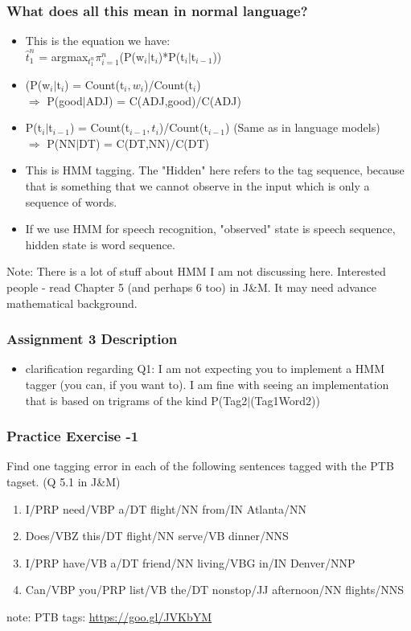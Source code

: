 \documentclass{beamer}
\begin{document}
\begin{frame}
\frametitle{What does all this mean in normal language?}
\begin{itemize}
\item This is the equation we have: \\ $\hat t_1^n$ = argmax$_{t_1^n} \pi_{i=1}^n$(P(w$_i|$t$_i$)*P(t$_i|$t$_{i-1}$))
\item (P(w$_i|$t$_i$) = Count(t$_i,w_i$)/Count(t$_i$)
\\ $\Rightarrow$ P(good$|$ADJ) = C(ADJ,good)/C(ADJ)
\item P(t$_i|$t$_{i-1}$) = Count(t$_{i-1},t_i$)/Count(t$_{i-1}$) (Same as in language models)
\\  $\Rightarrow$  P(NN$|$DT) = C(DT,NN)/C(DT)
\item This is HMM tagging. The "Hidden" here refers to the tag sequence, because that is something that we cannot observe in the input which is only a sequence of words.
\item If we use HMM for speech recognition, "observed" state is speech sequence, hidden state is word sequence.
\end{itemize}
Note: There is a lot of stuff about HMM I am not discussing here. Interested people - read Chapter 5 (and perhaps 6 too) in J\&M. It may need advance mathematical background.
\end{frame}

\begin{frame}
\frametitle{Assignment 3 Description}
\begin{itemize}
\item clarification regarding Q1: I am not expecting you to implement a HMM tagger (you can, if you want to). I am fine with seeing an implementation that is based on trigrams of the kind P(Tag2$|$(Tag1Word2))
\end{itemize}
\end{frame}

\begin{frame}
\frametitle{Practice Exercise -1}
Find one tagging error in each of the following sentences tagged with the PTB tagset. (Q 5.1 in J\&M)
\begin{enumerate}
\item I/PRP need/VBP a/DT flight/NN from/IN Atlanta/NN
\item Does/VBZ this/DT flight/NN serve/VB dinner/NNS
\item I/PRP have/VB a/DT friend/NN living/VBG in/IN Denver/NNP
\item Can/VBP you/PRP list/VB the/DT nonstop/JJ afternoon/NN flights/NNS
\end{enumerate}
note: PTB tags: \url{https://goo.gl/JVKbYM}
\end{frame}
\end{document}
